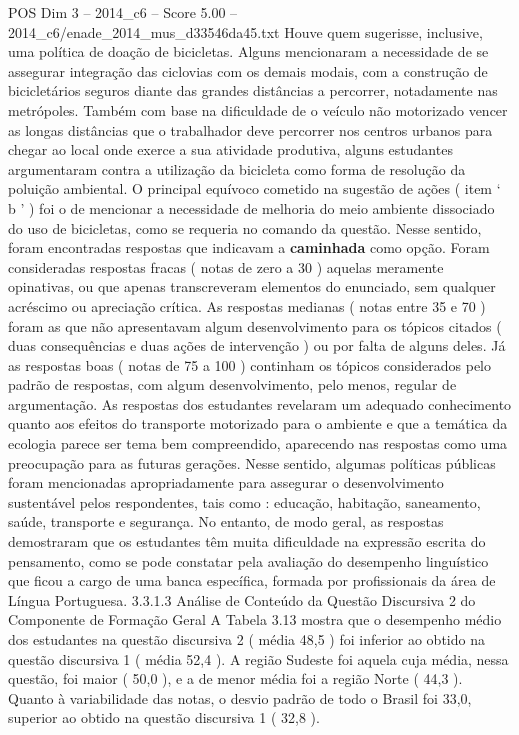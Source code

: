 \begin{textsample}{POS Dim 3 – 2014\_c6 – Score 5.00 – 2014\_c6/enade\_2014\_mus\_d33546da45.txt}
Houve quem sugerisse, inclusive, uma política de doação de bicicletas.
Alguns mencionaram a necessidade de se assegurar integração das ciclovias com os demais modais, com a construção de bicicletários seguros diante das grandes distâncias a percorrer, notadamente nas metrópoles.
Também com base na dificuldade de o veículo não motorizado vencer as longas distâncias que o trabalhador deve percorrer nos centros urbanos para chegar ao local onde exerce a sua atividade produtiva, alguns estudantes argumentaram contra a utilização da bicicleta como forma de resolução da poluição ambiental.
O principal equívoco cometido na sugestão de ações ( item ‘ b ’ ) foi o de mencionar a necessidade de melhoria do meio ambiente dissociado do uso de bicicletas, como se requeria no comando da questão.
Nesse sentido, foram encontradas respostas que indicavam a \textbf{caminhada} como opção.
Foram consideradas respostas fracas ( notas de zero a 30 ) aquelas meramente opinativas, ou que apenas transcreveram elementos do enunciado, sem qualquer acréscimo ou apreciação crítica.
As respostas medianas ( notas entre 35 e 70 ) foram as que não apresentavam algum desenvolvimento para os tópicos citados ( duas consequências e duas ações de intervenção ) ou por falta de alguns deles.
Já as respostas boas ( notas de 75 a 100 ) continham os tópicos considerados pelo padrão de respostas, com algum desenvolvimento, pelo menos, regular de argumentação.
As respostas dos estudantes revelaram um adequado conhecimento quanto aos efeitos do transporte motorizado para o ambiente e que a temática da ecologia parece ser tema bem compreendido, aparecendo nas respostas como uma preocupação para as futuras gerações.
Nesse sentido, algumas políticas públicas foram mencionadas apropriadamente para assegurar o desenvolvimento sustentável pelos respondentes, tais como : educação, habitação, saneamento, saúde, transporte e segurança.
No entanto, de modo geral, as respostas demostraram que os estudantes têm muita dificuldade na expressão escrita do pensamento, como se pode constatar pela avaliação do desempenho linguístico que ficou a cargo de uma banca específica, formada por profissionais da área de Língua Portuguesa. 3.3.1.3 Análise de Conteúdo da Questão Discursiva 2 do Componente de Formação Geral A Tabela 3.13 mostra que o desempenho médio dos estudantes na questão discursiva 2 ( média 48,5 ) foi inferior ao obtido na questão discursiva 1 ( média 52,4 ).
A região Sudeste foi aquela cuja média, nessa questão, foi maior ( 50,0 ), e a de menor média foi a região Norte ( 44,3 ).
Quanto à variabilidade das notas, o desvio padrão de todo o Brasil foi 33,0, superior ao obtido na questão discursiva 1 ( 32,8 ).

\end{textsample}
